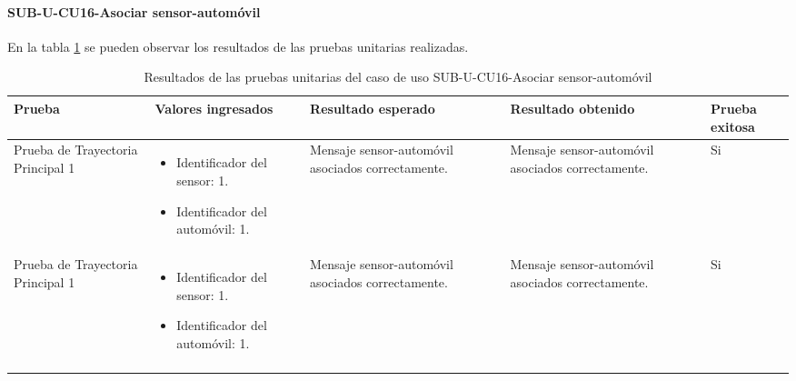 \paragraph{SUB-U-CU16-Asociar sensor-automóvil}\label{SUB-U-CU16:Pruebas}
En la tabla \ref{pruebas_unitarias_sub-u-cu16} se pueden observar los resultados de las pruebas unitarias realizadas.
\begin{longtable}{|M{2cm}| M{4.5cm}|M{3cm}|M{3cm}|M{1.5cm}|}
	\hline
	\textbf{Prueba} & \textbf{Valores ingresados} & \textbf{Resultado esperado} & \textbf{Resultado obtenido} & \textbf{Prueba exitosa} \\ \hline
	Prueba de Trayectoria Principal 1 & 
	\begin{itemize}
		\item Identificador del sensor: 1.
		\item Identificador del automóvil: 1.
	\end{itemize}
	& 
	Mensaje sensor-automóvil asociados correctamente.
	&
	Mensaje sensor-automóvil asociados correctamente.
	& Si \\ \hline

	Prueba de Trayectoria Principal 1 & 
	\begin{itemize}
		\item Identificador del sensor: 1.
		\item Identificador del automóvil: 1.
	\end{itemize}
	& 
	Mensaje sensor-automóvil asociados correctamente.
	&
	Mensaje sensor-automóvil asociados correctamente.
	& Si \\ \hline

	\caption{Resultados de las pruebas unitarias del caso de uso SUB-U-CU16-Asociar sensor-automóvil}
	\label{pruebas_unitarias_sub-u-cu16}
\end{longtable}